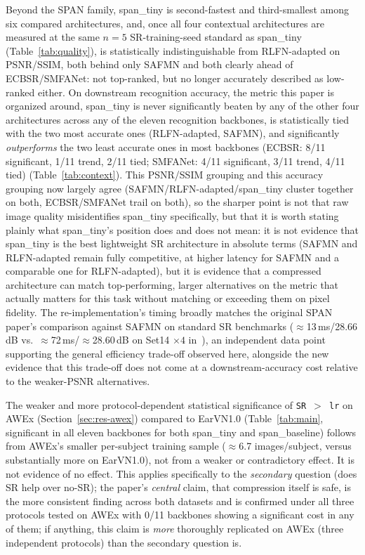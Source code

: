 \documentclass[pdflatex,sn-vancouver-num]{sn-jnl}
\begin{document}
\label{sec:disc-position}
Beyond the SPAN family, span\_tiny is second-fastest and third-smallest among six compared architectures, and, once all four contextual architectures are measured at the same $n=5$ SR-training-seed standard as span\_tiny (Table~\ref{tab:quality}), is statistically indistinguishable from RLFN-adapted on PSNR/SSIM, both behind only SAFMN and both clearly ahead of ECBSR/SMFANet: not top-ranked, but no longer accurately described as low-ranked either. On downstream recognition accuracy, the metric this paper is organized around, span\_tiny is never significantly beaten by any of the other four architectures across any of the eleven recognition backbones, is statistically tied with the two most accurate ones (RLFN-adapted, SAFMN), and significantly \emph{outperforms} the two least accurate ones in most backbones (ECBSR: 8/11 significant, 1/11 trend, 2/11 tied; SMFANet: 4/11 significant, 3/11 trend, 4/11 tied) (Table~\ref{tab:context}). This PSNR/SSIM grouping and this accuracy grouping now largely agree (SAFMN/RLFN-adapted/span\_tiny cluster together on both, ECBSR/SMFANet trail on both), so the sharper point is not that raw image quality misidentifies span\_tiny specifically, but that it is worth stating plainly what span\_tiny's position does and does not mean: it is not evidence that span\_tiny is the best lightweight SR architecture in absolute terms (SAFMN and RLFN-adapted remain fully competitive, at higher latency for SAFMN and a comparable one for RLFN-adapted), but it is evidence that a compressed architecture can match top-performing, larger alternatives on the metric that actually matters for this task without matching or exceeding them on pixel fidelity. The re-implementation's timing broadly matches the original SPAN paper's comparison against SAFMN on standard SR benchmarks ($\approx$13\,ms/28.66\,dB vs.\ $\approx$72\,ms/$\approx$28.60\,dB on Set14 $\times4$ in~\cite{wan2024span}), an independent data point supporting the general efficiency trade-off observed here, alongside the new evidence that this trade-off does not come at a downstream-accuracy cost relative to the weaker-PSNR alternatives.

\label{sec:disc-power}
The weaker and more protocol-dependent statistical significance of \texttt{SR $>$ lr} on AWEx (Section~\ref{sec:res-awex}) compared to EarVN1.0 (Table~\ref{tab:main}, significant in all eleven backbones for both span\_tiny and span\_baseline) follows from AWEx's smaller per-subject training sample ($\approx$6.7 images/subject, versus substantially more on EarVN1.0), not from a weaker or contradictory effect. It is not evidence of no effect. This applies specifically to the \emph{secondary} question (does SR help over no-SR); the paper's \emph{central} claim, that compression itself is safe, is the more consistent finding across both datasets and is confirmed under all three protocols tested on AWEx with 0/11 backbones showing a significant cost in any of them; if anything, this claim is \emph{more} thoroughly replicated on AWEx (three independent protocols) than the secondary question is.
\end{document}
